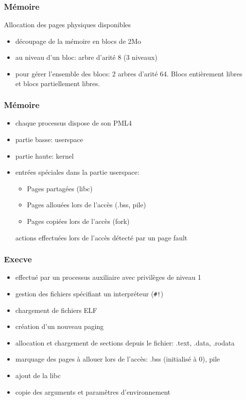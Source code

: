 \documentclass[10pt,a4paper]{beamer}
\begin{document}
\begin{frame}
	\frametitle{Mémoire}
	Allocation des pages physiques disponibles

	\begin{itemize}
		\item découpage de la mémoire en blocs de 2Mo
		\item au niveau d'un bloc: arbre d'arité 8 (3 niveaux)
		\item pour gérer l'ensemble des blocs:
			2 arbres d'arité 64. Blocs entièrement libres et blocs partiellement libres.
	\end{itemize}
\end{frame}

\begin{frame}
	\frametitle{Mémoire}

	\begin{itemize}
		\item chaque processus dispose de son PML4
		\item partie basse: userspace
		\item partie haute: kernel
		\item entrées spéciales dans la partie userspace:
			\begin{itemize}
				\item Pages partagées (libc)
				\item Pages allouées lors de l'accès (.bss, pile)
				\item Pages copiées lors de l'accès (fork)
			\end{itemize}
			actions effectuées lors de l'accès détecté par un page fault
	\end{itemize}

\end{frame}

\begin{frame}
	\frametitle{Execve}
	\begin{itemize}
		\item effectué par un processus auxiliaire avec privilèges de niveau 1
		\item gestion des fichiers spécifiant un interpréteur (\texttt{\#!})
		\item chargement de fichiers ELF
		\item création d'un nouveau paging
		\item allocation et chargement de sections depuis le fichier: .text, .data, .rodata
		\item marquage des pages à allouer lors de l'accès: .bss (initialisé à 0), pile
		\item ajout de la libc
		\item copie des arguments et paramêtres d'environnement
	\end{itemize}
\end{frame}
\end{document}
